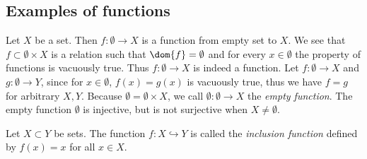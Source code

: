 \subsection*{Examples of functions}

\begin{example}
    Let $X$ be a set. Then $f : \emptyset \to X$ is a function from empty set to $X$. We see that $f \subset \emptyset \times X$ is a relation such that $\dom{f} = \emptyset$ and for every $x \in \emptyset$ the property of functions is vacuously true. Thus $f : \emptyset \to X$ is indeed a function. Let $f : \emptyset \to X$ and $g : \emptyset \to Y$, since for $x \in \emptyset$, $f(x) = g(x)$ is vacuously true, thus we have $f = g$ for arbitrary $X, Y$. Because $\emptyset = \emptyset \times X$, we call $\emptyset : \emptyset \to X$ the \emph{empty function}. The empty function $\emptyset$ is injective, but is not surjective when $X \neq \emptyset$.
\end{example}

\begin{example}
    Let $X \subset Y$ be sets. The function $f : X \hookrightarrow Y$ is called the \emph{inclusion function} defined by $f(x) = x$ for all $x \in X$.
\end{example}

